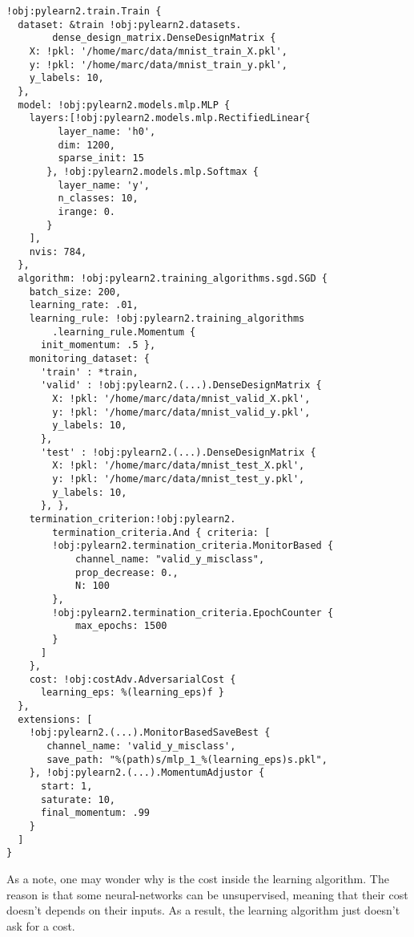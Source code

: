 		\lstset{language=Python}
		\begin{lstlisting}[basicstyle=\small,frame=single]
!obj:pylearn2.train.Train {
  dataset: &train !obj:pylearn2.datasets.
        dense_design_matrix.DenseDesignMatrix {
    X: !pkl: '/home/marc/data/mnist_train_X.pkl',
    y: !pkl: '/home/marc/data/mnist_train_y.pkl',
    y_labels: 10,
  },
  model: !obj:pylearn2.models.mlp.MLP {
    layers:[!obj:pylearn2.models.mlp.RectifiedLinear{
         layer_name: 'h0',
         dim: 1200,
         sparse_init: 15
       }, !obj:pylearn2.models.mlp.Softmax {
         layer_name: 'y',
         n_classes: 10,
         irange: 0.
       }
    ],
    nvis: 784,
  },
  algorithm: !obj:pylearn2.training_algorithms.sgd.SGD {
    batch_size: 200,
    learning_rate: .01,
    learning_rule: !obj:pylearn2.training_algorithms
        .learning_rule.Momentum {
      init_momentum: .5 },
    monitoring_dataset: {
      'train' : *train,
      'valid' : !obj:pylearn2.(...).DenseDesignMatrix {
        X: !pkl: '/home/marc/data/mnist_valid_X.pkl',
        y: !pkl: '/home/marc/data/mnist_valid_y.pkl',
        y_labels: 10,
      },
      'test' : !obj:pylearn2.(...).DenseDesignMatrix {
        X: !pkl: '/home/marc/data/mnist_test_X.pkl',
        y: !pkl: '/home/marc/data/mnist_test_y.pkl',
        y_labels: 10,
      }, },
    termination_criterion:!obj:pylearn2.
    	termination_criteria.And { criteria: [
        !obj:pylearn2.termination_criteria.MonitorBased {
            channel_name: "valid_y_misclass",
            prop_decrease: 0.,
            N: 100
        },
        !obj:pylearn2.termination_criteria.EpochCounter {
            max_epochs: 1500
        }
      ]
    },
    cost: !obj:costAdv.AdversarialCost {
      learning_eps: %(learning_eps)f }
  },
  extensions: [
    !obj:pylearn2.(...).MonitorBasedSaveBest {
       channel_name: 'valid_y_misclass',
       save_path: "%(path)s/mlp_1_%(learning_eps)s.pkl",
    }, !obj:pylearn2.(...).MomentumAdjustor {
      start: 1,
      saturate: 10,
      final_momentum: .99
    }
  ]
}
		\end{lstlisting}

		As a note, one may wonder why is the cost inside the learning algorithm. The reason is that some neural-networks can be unsupervised, meaning that their cost doesn't depends on their inputs. As a result, the learning algorithm just doesn't ask for a cost. 

